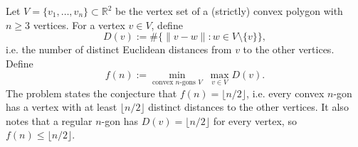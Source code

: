 Let $V=\{v_1,\dots,v_n\}\subset\mathbb R^2$ be the vertex set of a (strictly) convex polygon with $n\ge 3$ vertices.
For a vertex $v\in V$, define
\[
D(v):=\#\bigl\{\|v-w\|: w\in V\setminus\{v\}\bigr\},
\]
i.e. the number of distinct Euclidean distances from $v$ to the other vertices.
Define
\[
f(n):=\min_{\text{convex }n\text{-gons }V}\;\max_{v\in V} D(v).
\]
The problem states the conjecture that $f(n)=\lfloor n/2\rfloor$, i.e. every convex $n$-gon has a vertex with at least $\lfloor n/2\rfloor$ distinct distances to the other vertices.
It also notes that a regular $n$-gon has $D(v)=\lfloor n/2\rfloor$ for every vertex, so $f(n)\le \lfloor n/2\rfloor$.

